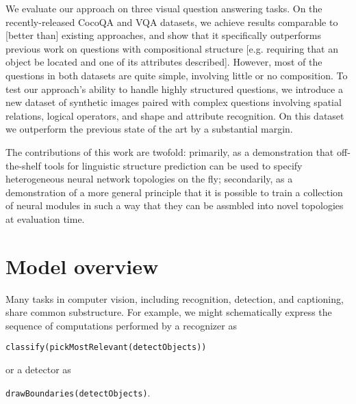 \documentclass{article} %
\theoremstyle{definition}
\theoremstyle{example}
\begin{document}
We evaluate our approach on three visual question answering tasks. On the
recently-released CocoQA and VQA datasets, we achieve results comparable to
[better than] existing approaches, and show that it specifically outperforms
previous work on questions with compositional structure [e.g. requiring that an
object be located and one of its attributes described]. However, most of the
questions in both datasets are quite simple, involving little or no composition.
To test our approach's ability to handle highly structured questions, we
introduce a new dataset of synthetic images paired with complex questions
involving spatial relations, logical operators, and shape and attribute
recognition. On this dataset we outperform the previous state of the art by a
substantial margin.


The contributions of this work are twofold: primarily, as a 
demonstration that off-the-shelf tools for linguistic structure prediction can
be used to specify heterogeneous neural network topologies on the fly;
secondarily, as a demonstration of a more general principle that it is possible
to train a collection of neural modules in such a way that they can be assmbled
into novel topologies at evaluation time.

\section{Model overview}

Many tasks in computer vision, including recognition, detection, and captioning,
share common substructure. For example, we might schematically express the
sequence of computations performed by a recognizer as
\begin{flushleft}
  {\tt classify(pickMostRelevant(detectObjects))}
\end{flushleft}
or a detector as
\begin{flushleft}
  {\tt drawBoundaries(detectObjects)}.
\end{flushleft}
\end{document}
